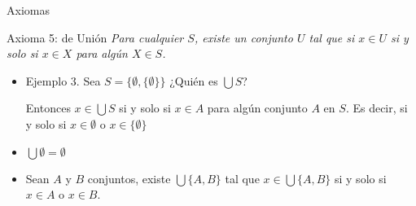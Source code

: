 \documentclass{beamer}
\begin{document}
\begin{frame}{Axiomas}
    \begin{block}{Axioma 5: de Unión}
        \textit {Para cualquier $S$, existe un conjunto $U$ tal que si $x \in U$ si y solo si $x \in X$ para algún $X \in S$.}
    \end{block}

\vspace{1em}

    \begin{itemize}
        \item Ejemplo 3. Sea $S=\{\emptyset, \{\emptyset\}\}$
        \pause
        ¿Quién es $\bigcup S$?
        \pause
        \vspace{1em}

        Entonces $x \in \bigcup S$ si y solo si $x \in A$ para algún conjunto $A$ en $S$. Es decir, si y solo si $x \in \emptyset$
        o $x \in \{\emptyset\}$
        \item $\bigcup \emptyset = \emptyset$
        \item Sean $A$ y $B$ conjuntos, existe $\bigcup \{A, B \}$ tal que $x \in \bigcup \{A, B \}$ si y solo si
        $x \in A$ o $x \in B$. 
    \end{itemize}

\end{frame}
\end{document}
